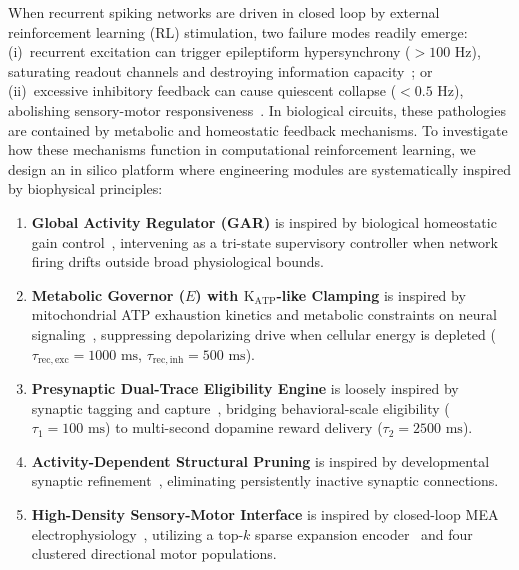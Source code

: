 \documentclass[journal]{IEEEtran}
\begin{document}
When recurrent spiking networks are driven in closed loop by external reinforcement learning (RL) stimulation, two failure modes readily emerge: (i)~recurrent excitation can trigger epileptiform hypersynchrony ($>100\text{ Hz}$), saturating readout channels and destroying information capacity~\cite{McCormick2001Cellular}; or (ii)~excessive inhibitory feedback can cause quiescent collapse ($<0.5\text{ Hz}$), abolishing sensory-motor responsiveness~\cite{Turrigiano2008SelfTuning}. In biological circuits, these pathologies are contained by metabolic and homeostatic feedback mechanisms. To investigate how these mechanisms function in computational reinforcement learning, we design an in silico platform where engineering modules are systematically inspired by biophysical principles:
\begin{enumerate}
    \item \textbf{Global Activity Regulator (GAR)} is inspired by biological homeostatic gain control~\cite{Turrigiano2008SelfTuning}, intervening as a tri-state supervisory controller when network firing drifts outside broad physiological bounds.
    \item \textbf{Metabolic Governor ($E$) with $\mathrm{K}_{\mathrm{ATP}}$-like Clamping} is inspired by mitochondrial ATP exhaustion kinetics and metabolic constraints on neural signaling~\cite{Laughlin1998Metabolic,Tanner2011}, suppressing depolarizing drive when cellular energy is depleted ($\tau_{\mathrm{rec,exc}} = 1000\text{ ms}$, $\tau_{\mathrm{rec,inh}} = 500\text{ ms}$).
    \item \textbf{Presynaptic Dual-Trace Eligibility Engine} is loosely inspired by synaptic tagging and capture~\cite{Frey1997SynapticTagging}, bridging behavioral-scale eligibility ($\tau_1 = 100\text{ ms}$) to multi-second dopamine reward delivery ($\tau_2 = 2500\text{ ms}$).
    \item \textbf{Activity-Dependent Structural Pruning} is inspired by developmental synaptic refinement~\cite{Navlakha2015Pruning}, eliminating persistently inactive synaptic connections.
    \item \textbf{High-Density Sensory-Motor Interface} is inspired by closed-loop MEA electrophysiology~\cite{Kagan2022DishBrain}, utilizing a top-$k$ sparse expansion encoder~\cite{Kanerva1988SDM,Babadi2014Sparse} and four clustered directional motor populations.
\end{enumerate}
\end{document}
